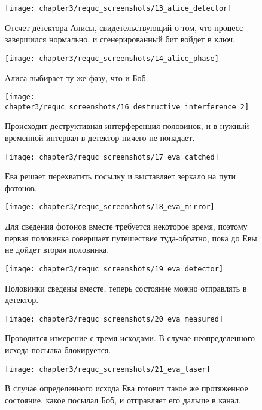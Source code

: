 \begin{figure}[h]
  \texttt{[image: chapter3/requc\_screenshots/13\_alice\_detector]}
  \caption{Отсчет детектора Алисы, свидетельствующий о том, что процесс завершился нормально, и сгенерированный бит войдет в ключ.}
\end{figure}

\begin{figure}[h]
  \texttt{[image: chapter3/requc\_screenshots/14\_alice\_phase]}
  \caption{Алиса выбирает ту же фазу, что и Боб.}
\end{figure}

\begin{figure}[h]
  \texttt{[image: chapter3/requc\_screenshots/16\_destructive\_interference\_2]}
  \caption{Происходит деструктивная интерференция половинок, и в нужный временной интервал в детектор ничего не попадает.}
\end{figure}

\clearpage

\begin{figure}[h]
  \texttt{[image: chapter3/requc\_screenshots/17\_eva\_catched]}
  \caption{Ева решает перехватить посылку и выставляет зеркало на пути фотонов.}
\end{figure}

\begin{figure}[h]
  \texttt{[image: chapter3/requc\_screenshots/18\_eva\_mirror]}
  \caption{Для сведения фотонов вместе требуется некоторое время, поэтому первая половинка совершает путешествие туда-обратно, пока до Евы не дойдет вторая половинка.}
\end{figure}

\begin{figure}[h]
  \texttt{[image: chapter3/requc\_screenshots/19\_eva\_detector]}
  \caption{Половинки сведены вместе, теперь состояние можно отправлять в детектор.}
\end{figure}

\begin{figure}[h]
  \texttt{[image: chapter3/requc\_screenshots/20\_eva\_measured]}
  \caption{Проводится измерение с тремя исходами. В случае неопределенного исхода посылка блокируется.}
\end{figure}

\begin{figure}[h]
  \texttt{[image: chapter3/requc\_screenshots/21\_eva\_laser]}
  \caption{В случае определенного исхода Ева готовит такое же протяженное состояние, какое посылал Боб, и отправляет его дальше в канал.}
\end{figure}

